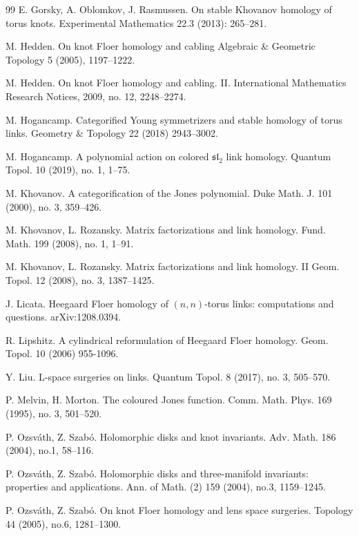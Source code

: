 \documentclass[10pt,a4paper]{amsart}
\begin{document}
\begin{thebibliography}{99}
 E. Gorsky, A. Oblomkov, J. Rasmussen. On stable Khovanov homology of torus knots. Experimental Mathematics 22.3 (2013): 265--281.

 M. Hedden. On knot Floer homology and cabling
Algebraic \& Geometric Topology 5 (2005), 1197--1222.

  M. Hedden. On knot Floer homology and cabling. II.
International Mathematics Research Notices, 2009, no. 12, 2248--2274.

M. Hogancamp. Categorified Young symmetrizers and stable homology of torus links.
Geometry \& Topology 22 (2018) 2943--3002.

 M. Hogancamp. A polynomial action on colored  $\mathfrak{sl}_2$  link homology.
Quantum Topol. 10 (2019), no. 1, 1--75.


  M. Khovanov. A categorification of the Jones polynomial.
Duke Math. J. 101 (2000), no. 3, 359--426.

 M. Khovanov, L. Rozansky. Matrix factorizations and link homology.
Fund. Math. 199 (2008), no. 1, 1--91.

  M. Khovanov, L. Rozansky. Matrix factorizations and link homology. II
Geom. Topol. 12 (2008), no. 3, 1387--1425.


 J. Licata. Heegaard Floer homology of $(n,n)$-torus links: computations and questions.  arXiv:1208.0394.

 R. Lipshitz. A cylindrical reformulation of Heegaard Floer homology. Geom. Topol. 10 (2006) 955-1096.

 Y. Liu. L-space surgeries on links. Quantum Topol. 8 (2017), no. 3, 505--570.

 P. Melvin, H. Morton. The coloured Jones function. Comm. Math. Phys. 169 (1995), no. 3, 501--520.



 P. Ozsv\'ath, Z. Szab\'o. Holomorphic disks and knot invariants. Adv. Math. 186 (2004), no.1, 58--116. 



 P. Ozsv\'ath, Z. Szab\'o. Holomorphic disks and three-manifold invariants: properties  and applications. Ann. of Math. (2) 159 (2004), no.3, 1159--1245. 

 P. Ozsv\'ath, Z. Szab\'o. On knot Floer homology and lens space surgeries. Topology 44 (2005), no.6, 1281--1300.



\end{thebibliography}
\end{document}
